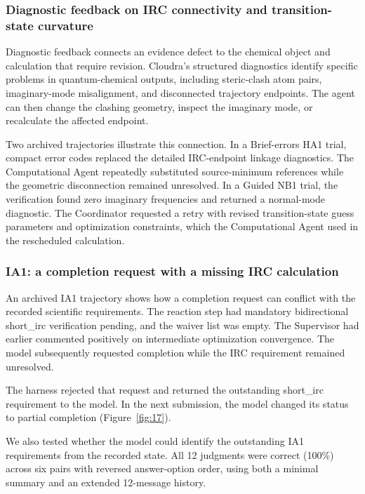 \subsubsection{Diagnostic feedback on IRC connectivity and transition-state curvature}

Diagnostic feedback connects an evidence defect to the chemical object and calculation that require revision. Cloudra's structured diagnostics identify specific problems in quantum-chemical outputs, including steric-clash atom pairs, imaginary-mode misalignment, and disconnected trajectory endpoints. The agent can then change the clashing geometry, inspect the imaginary mode, or recalculate the affected endpoint.

Two archived trajectories illustrate this connection. In a Brief-errors HA1 trial, compact error codes replaced the detailed IRC-endpoint linkage diagnostics. The Computational Agent repeatedly substituted source-minimum references while the geometric disconnection remained unresolved. In a Guided NB1 trial, the verification found zero imaginary frequencies and returned a normal-mode diagnostic. The Coordinator requested a retry with revised transition-state guess parameters and optimization constraints, which the Computational Agent used in the rescheduled calculation.\citep{ref18}

\subsubsection{IA1: a completion request with a missing IRC calculation}

An archived IA1 trajectory shows how a completion request can conflict with the recorded scientific requirements. The reaction step had mandatory bidirectional short\_irc verification pending, and the waiver list was empty. The Supervisor had earlier commented positively on intermediate optimization convergence. The model subsequently requested completion while the IRC requirement remained unresolved.

The harness rejected that request and returned the outstanding short\_irc requirement to the model. In the next submission, the model changed its status to partial completion (Figure~\ref{fig:17}).

We also tested whether the model could identify the outstanding IA1 requirements from the recorded state. All 12 judgments were correct (100\%) across six pairs with reversed answer-option order, using both a minimal summary and an extended 12-message history.


